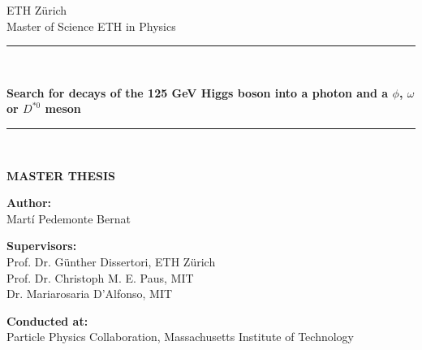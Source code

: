 \begin{titlepage}
\begin{center}

\vspace*{-2.0cm}

\begin{LARGE}
ETH Zürich\\[0.0cm]
Master of Science ETH in Physics\\
\end{LARGE}

\vspace*{0.9cm}

\rule{16cm}{0.1mm}\\
\begin{Huge}
\textbf{Search for decays of the 125 GeV Higgs boson into a photon and a $\phi$, $\omega$ or $D^{*0}$ meson} \\
\end{Huge}
\rule{16cm}{0.1mm}\\

\vspace*{1.3cm}

\textbf{\LARGE MASTER THESIS}\\

\vspace*{3.3cm}

\begin{Large}
\textbf{Author:}\\[0.0cm]
Martí Pedemonte Bernat\\[0.0cm]
\end{Large}

\vspace*{1.0cm}

\begin{Large}
\textbf{Supervisors:}\\[0.0cm]
Prof. Dr. Günther Dissertori, ETH Zürich\\[0.0cm]
Prof. Dr. Christoph M. E. Paus, MIT\\[0.0cm]
Dr. Mariarosaria D'Alfonso, MIT\\[0.0cm]
\end{Large}

\vspace*{1.0cm}

\begin{Large}
\textbf{Conducted at:}\\[0.0cm]
Particle Physics Collaboration, Massachusetts Institute of Technology\\[0.0cm]
\end{Large}


\end{center}
\end{titlepage}

